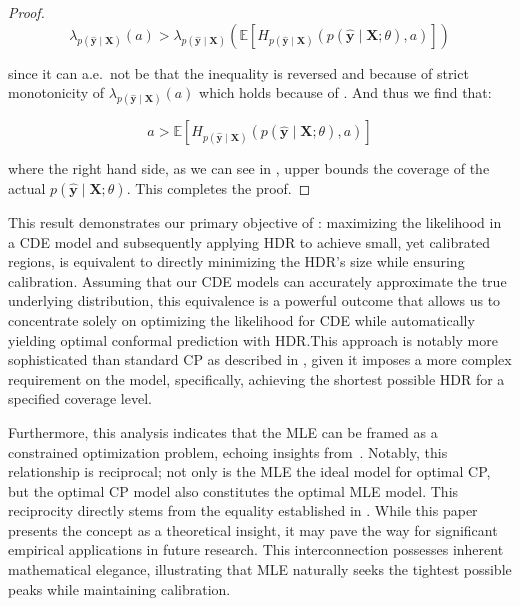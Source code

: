 \begin{proof}
    \begin{equation}
        \lambda_{p(\mathbf{\hat{y}}\mid\mathbf{X})}(a) > \lambda_{p(\mathbf{\hat{y}}\mid\mathbf{X})}\left(
        \mathbb{E}\left[H_{p(\hat{\mathbf{y}}\mid \mathbf{X})}(p(\mathbf{\hat{y}}\mid \mathbf{X};
                \theta), a)
                \right] \right)
    \end{equation}

    since it can a.e.\ not be that the inequality is reversed and because of strict monotonicity of $\lambda_{p(\mathbf{\hat{y}}\mid\mathbf{X})}(a)$ which holds because of . And thus we find that:

    \begin{equation}
        a > \mathbb{E}\left[H_{p(\hat{\mathbf{y}}\mid \mathbf{X})}(p(\mathbf{\hat{y}}\mid \mathbf{X};\theta), a)\right]
    \end{equation}

    where the right hand side, as we can see in , upper bounds the coverage of the actual $p(\mathbf{\hat{y}}\mid \mathbf{X};\theta)$. This completes the proof.

\end{proof}
This result demonstrates our primary objective of : maximizing the likelihood in a CDE model and subsequently applying HDR to achieve small, yet calibrated regions, is equivalent to directly minimizing the HDR's size while ensuring calibration. Assuming that our CDE models can accurately approximate the true underlying distribution, this equivalence is a powerful outcome that allows us to concentrate solely on optimizing the likelihood for CDE while automatically yielding optimal conformal prediction with HDR.\@ This approach is notably more sophisticated than standard CP as described in , given it imposes a more complex requirement on the model, specifically, achieving the shortest possible HDR for a specified coverage level.

Furthermore, this analysis indicates that the MLE can be framed as a constrained optimization problem, echoing insights from~\cite{chung2021beyond}. Notably, this relationship is reciprocal; not only is the MLE the ideal model for optimal CP, but the optimal CP model also constitutes the optimal MLE model. This reciprocity directly stems from the equality established in . While this paper presents the concept as a theoretical insight, it may pave the way for significant empirical applications in future research. This interconnection possesses inherent mathematical elegance, illustrating that MLE naturally seeks the tightest possible peaks while maintaining calibration.

